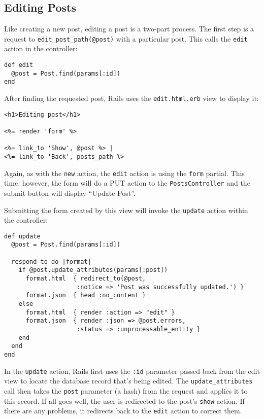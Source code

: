 \documentclass[10pt]{book}
\begin{document}
\subsection{ Editing Posts}

Like creating a new post, editing a post is a two-part process. The first step is a request to \texttt{edit\_post\_path(@post)} with a particular post. This calls the \texttt{edit} action in the controller:


\begin{verbatim}
def edit
  @post = Post.find(params[:id])
end
\end{verbatim}

After finding the requested post, Rails uses the \texttt{edit.html.erb} view to display it:
\begin{verbatim}
<h1>Editing post</h1>
 
<%= render 'form' %>
 
<%= link_to 'Show', @post %> |
<%= link_to 'Back', posts_path %>
\end{verbatim}

Again, as with the \texttt{new} action, the \texttt{edit} action is using the \texttt{form} partial. This time, however, the form will do a PUT action to the \texttt{PostsController} and the submit button will display “Update Post”.

Submitting the form created by this view will invoke the \texttt{update} action within the controller:


\begin{verbatim}
def update
  @post = Post.find(params[:id])
 
  respond_to do |format|
    if @post.update_attributes(params[:post])
      format.html  { redirect_to(@post,
                    :notice => 'Post was successfully updated.') }
      format.json  { head :no_content }
    else
      format.html  { render :action => "edit" }
      format.json  { render :json => @post.errors,
                    :status => :unprocessable_entity }
    end
  end
end
\end{verbatim}

In the \texttt{update} action, Rails first uses the \texttt{:id} parameter passed back from the edit view to locate the database record that’s being edited. The \texttt{update\_attributes} call then takes the \texttt{post} parameter (a hash) from the request and applies it to this record. If all goes well, the user is redirected to the post’s \texttt{show} action. If there are any problems, it redirects back to the \texttt{edit} action to correct them.
\end{document}
